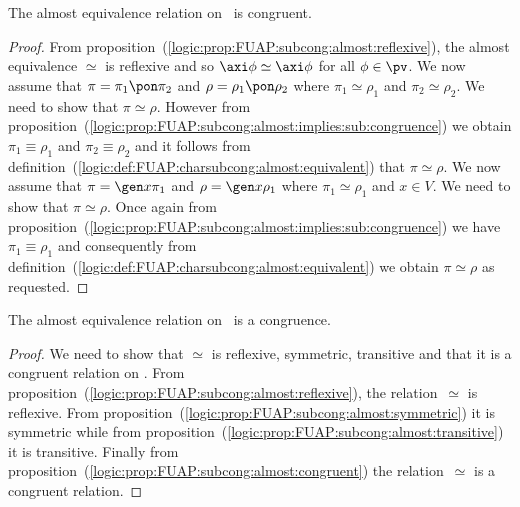 \begin{prop}\label{logic:prop:FUAP:subcong:almost:congruent}
The almost equivalence relation on \pvs\ is congruent.
\end{prop}
\begin{proof}
From proposition~(\ref{logic:prop:FUAP:subcong:almost:reflexive}),
the almost equivalence $\simeq$ is reflexive and so
$\axi\phi\simeq\axi\phi$ for all $\phi\in\pv$. We now assume that
$\pi=\pi_{1}\pon\pi_{2}$ and $\rho=\rho_{1}\pon\rho_{2}$ where
$\pi_{1}\simeq\rho_{1}$ and $\pi_{2}\simeq\rho_{2}$. We need to show
that $\pi\simeq\rho$. However from
proposition~(\ref{logic:prop:FUAP:subcong:almost:implies:sub:congruence})
we obtain $\pi_{1}\equiv\rho_{1}$ and $\pi_{2}\equiv\rho_{2}$ and it
follows from
definition~(\ref{logic:def:FUAP:charsubcong:almost:equivalent}) that
$\pi\simeq\rho$. We now assume that $\pi=\gen x\pi_{1}$ and
$\rho=\gen x\rho_{1}$ where $\pi_{1}\simeq\rho_{1}$ and $x\in V$. We
need to show that $\pi\simeq\rho$. Once again from
proposition~(\ref{logic:prop:FUAP:subcong:almost:implies:sub:congruence})
we have $\pi_{1}\equiv\rho_{1}$ and consequently from
definition~(\ref{logic:def:FUAP:charsubcong:almost:equivalent}) we
obtain $\pi\simeq\rho$ as requested.
\end{proof}

\begin{prop}\label{logic:prop:FUAP:subcong:almost:congruence}
The almost equivalence relation on \pvs\ is a congruence.
\end{prop}
\begin{proof}
We need to show that $\simeq$ is reflexive, symmetric, transitive
and that it is a congruent relation on \pvs. From
proposition~(\ref{logic:prop:FUAP:subcong:almost:reflexive}), the
relation~$\simeq$ is reflexive. From
proposition~(\ref{logic:prop:FUAP:subcong:almost:symmetric}) it is
symmetric while from
proposition~(\ref{logic:prop:FUAP:subcong:almost:transitive}) it is
transitive. Finally from
proposition~(\ref{logic:prop:FUAP:subcong:almost:congruent}) the
relation~$\simeq$ is a congruent relation.
\end{proof}


